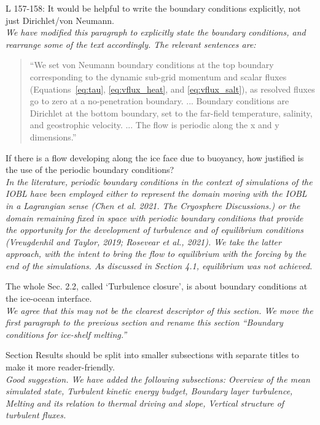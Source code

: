 \documentclass[tc, manuscript]{copernicus}
\begin{document}
L 157-158: It would be helpful to write the boundary conditions explicitly, not just Dirichlet/von Neumann. \\
\textit{We have modified this paragraph to explicitly state the boundary conditions, and rearrange some of the text accordingly. The relevant sentences are:}
\begin{quote}
``We set von Neumann boundary conditions at the top boundary corresponding to the dynamic sub-grid momentum and scalar fluxes (Equations~\ref{eq:tau}, \ref{eq:vflux_heat}, and \ref{eq:vflux_salt}), as resolved fluxes go to zero at a no-penetration boundary. ... Boundary conditions are Dirichlet at the bottom boundary, set to the far-field temperature, salinity, and geostrophic velocity. ... The flow is periodic along the x and y dimensions.''
\end{quote}\vspace{12pt}

If there is a flow developing along the ice face due to buoyancy, how justified is the use of the periodic boundary conditions?\\
\textit{In the literature, periodic boundary conditions in the context of simulations of the IOBL have been employed either to represent the domain moving with the IOBL in a Lagrangian sense (Chen et al. 2021. The Cryosphere Discussions.) or the domain remaining fixed in space with periodic boundary conditions that provide the opportunity for the development of turbulence and of equilibrium conditions (Vreugdenhil and Taylor, 2019; Rosevear et al., 2021). We take the latter approach, with the intent to bring the flow to equilibrium with the forcing by the end of the simulations. As discussed in Section 4.1, equilibrium was not achieved. }\vspace{12pt}

The whole Sec. 2.2, called ‘Turbulence closure’, is about boundary conditions at the ice-ocean interface.\\
\textit{We agree that this may not be the clearest descriptor of this section. We move the first paragraph to the previous section and rename this section ``Boundary conditions for ice-shelf melting.''}\vspace{12pt}

Section Results should be split into smaller subsections with separate titles to make it more reader-friendly.\\
\textit{Good suggestion. We have added the following subsections: Overview of the mean simulated state, Turbulent kinetic energy budget, Boundary layer turbulence, Melting and its relation to thermal driving and slope, Vertical structure of turbulent fluxes.}\vspace{12pt}
\end{document}
